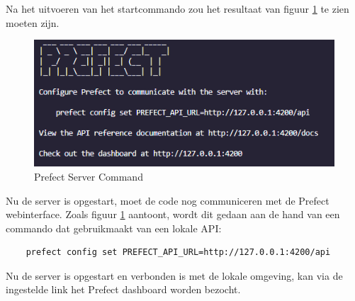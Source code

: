 Na het uitvoeren van het startcommando zou het resultaat van figuur \ref{fig:Prefect_server} te zien moeten zijn.
\begin{figure}[htbp]
    \includegraphics[width=\linewidth]{graphics/Prefect_server.PNG}
    \caption{Prefect Server Command}
    \label{fig:Prefect_server}
\end{figure}
Nu de server is opgestart, moet de code nog communiceren met de Prefect webinterface.
Zoals figuur \ref{fig:Prefect_server} aantoont, wordt dit gedaan aan de hand van een commando dat gebruikmaakt van een lokale API:
\begin{verbatim}
    prefect config set PREFECT_API_URL=http://127.0.0.1:4200/api
\end{verbatim}
Nu de server is opgestart en verbonden is met de lokale omgeving, kan via de ingestelde link het Prefect dashboard worden bezocht.
